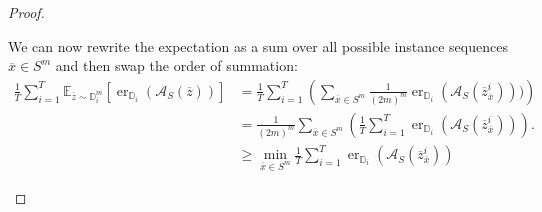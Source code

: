 \begin{proof}
\begin{subproof}
        We can now rewrite the expectation as a sum over all possible instance sequences $\overline{x} \in S^m$ and then swap the order of summation:
        \begin{align*}
            \frac{1}{T} \sum_{i=1}^{T} \mathbb{E}_{\overline{z} \sim \mathbb{D}_i^m} \left[ \operatorname{er}_{\mathbb{D}_i}(\mathcal{A}_S(\overline{z})) \right] &= \frac{1}{T}  \sum_{i=1}^{T} \left( \sum_{\overline{x} \in S^m} \frac{1}{(2m)^m} \operatorname{er}_{\mathbb{D}_i}(\mathcal{A}_S(\overline{z}_{\overline{x}}^{i}))) \right) \\
            &= \frac{1}{(2m)^m} \sum_{\overline{x} \in S^m} \left( \frac{1}{T} \sum_{i=1}^{T} \operatorname{er}_{\mathbb{D}_i}(\mathcal{A}_S(\overline{z}_{\overline{x}}^{i})) \right). \\
            &\geq \min_{\overline{x} \in S^m} \frac{1}{T}  \sum_{i=1}^{T} \operatorname{er}_{\mathbb{D}_i}(\mathcal{A}_S(\overline{z}_{\overline{x}}^{i}))
        \end{align*}


\end{subproof}
\end{proof}
